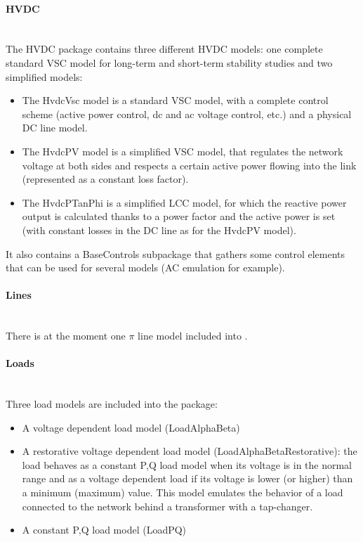 \documentclass[a4paper, 12pt]{report}
\begin{document}
\paragraph{HVDC}
~~\\

The HVDC package contains three different HVDC models: one complete standard VSC model for long-term and short-term stability studies and two simplified models:
\begin{itemize}
\item The HvdcVsc model is a standard VSC model, with a complete control scheme (active power control, dc and ac voltage control, etc.) and a physical DC line model.
\item The HvdcPV model is a simplified VSC model, that regulates the network voltage at both sides and respects a certain active power flowing into the link (represented as a constant loss factor).
\item The HvdcPTanPhi is a simplified LCC model, for which the reactive power output is calculated thanks to a power factor and the active power is set (with constant losses in the DC line as for the HvdcPV model).
\end{itemize}
It also contains a BaseControls subpackage that gathers some control elements that can be used for several models (AC emulation for example).

\paragraph{Lines}
~~\\

There is at the moment one $\pi$ line model included into \Dynawo.

\paragraph{Loads}
~~\\

Three load models are included into the package:
\begin{itemize}
\item A voltage dependent load model (LoadAlphaBeta)
\item A restorative voltage dependent load model (LoadAlphaBetaRestorative): the load behaves as a constant P,Q load model when its voltage is in the normal range and as a voltage dependent load if its voltage is lower (or higher) than a minimum (maximum) value. This model emulates the behavior of a load connected to the network behind a transformer with a tap-changer.
\item A constant P,Q load  model (LoadPQ)
\end{itemize}
\end{document}
